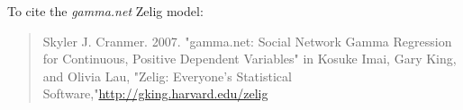 To cite the \emph{ gamma.net } Zelig model:
 \begin{verse}
 Skyler J. Cranmer. 2007. "gamma.net: Social Network Gamma Regression for Continuous, Positive Dependent Variables" in Kosuke Imai, Gary King, and Olivia Lau, "Zelig: Everyone's Statistical Software,"\url{http://gking.harvard.edu/zelig} 
\end{verse}